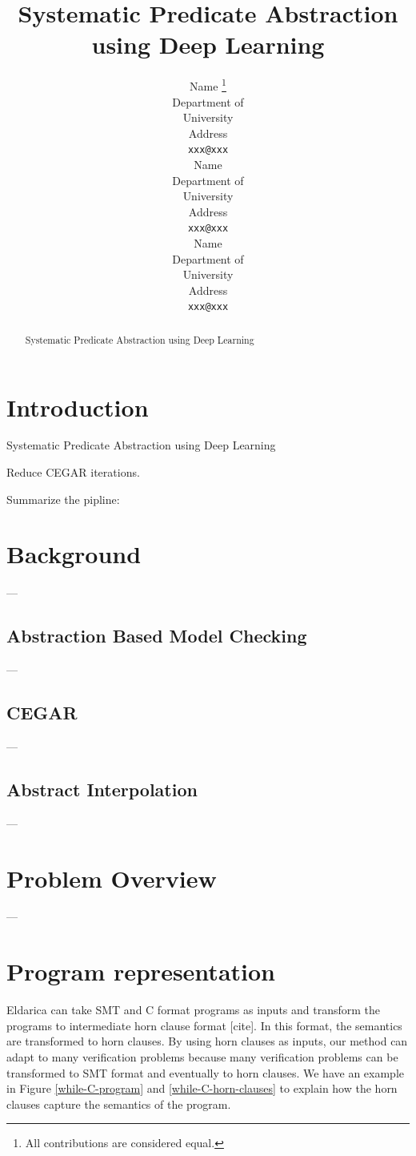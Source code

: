 \documentclass{article}
\title{Systematic Predicate Abstraction using Deep Learning}
\author{
  Name \thanks{All contributions are considered equal.}\\
  Department of \\
   University\\
  Address \\
  \texttt{xxx@xxx} \\
   \And
 Name \samethanks\\
  Department of \\
   University\\
  Address \\
  \texttt{xxx@xxx} \\
     \And
 Name \samethanks\\
  Department of \\
   University\\
  Address \\
  \texttt{xxx@xxx} \\
}
\begin{document}
\maketitle

\begin{abstract}
Systematic Predicate Abstraction using Deep Learning
\end{abstract}




\section{Introduction}
Systematic Predicate Abstraction using Deep Learning

Reduce CEGAR iterations.

Summarize the pipline:

\section{Background}
---
\subsection{Abstraction Based Model Checking}
---
\subsection{CEGAR}
---
\subsection{Abstract Interpolation}
---
\section{Problem Overview}
---

\section{Program representation}
Eldarica can take SMT and C format programs as inputs and transform the programs to intermediate horn clause format [cite]. In this format, the semantics are transformed to horn clauses. By using horn clauses as inputs, our method can adapt to many verification problems because many verification problems can be transformed to SMT format and eventually to horn clauses. We have an example in Figure \ref{while-C-program} and \ref{while-C-horn-clauses} to explain how the horn clauses capture the semantics of the program.
\end{document}
